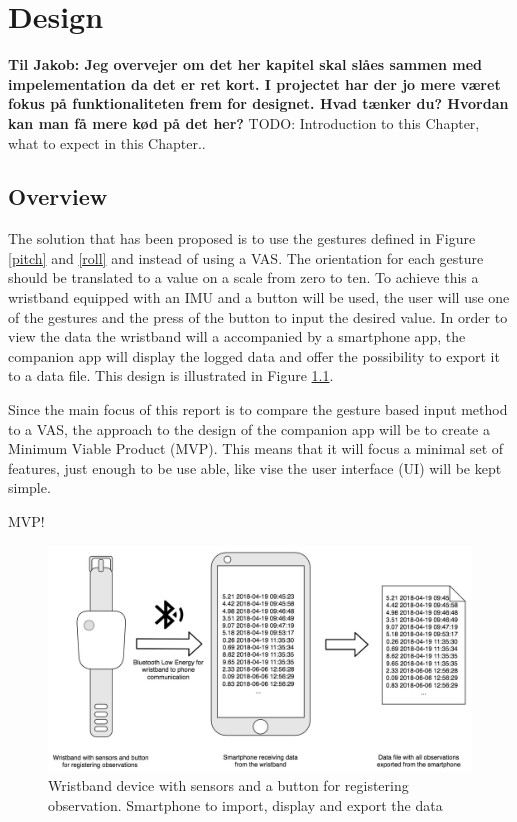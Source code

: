 \chapter{Design}\label{design_ch}
\textbf{Til Jakob: Jeg overvejer om det her kapitel skal slåes sammen med impelementation da det er ret kort. I projectet har der jo mere været fokus på funktionaliteten frem for designet. Hvad tænker du? Hvordan kan man få mere kød på det her?}
TODO: Introduction to this Chapter, what to expect in this Chapter..


\section{Overview}
The solution that has been proposed is to use the gestures defined in Figure \ref{pitch} and \ref{roll} and instead of using a VAS. The orientation for each gesture should be translated to a value on a scale from zero to ten. To achieve this a wristband equipped with an IMU and a button will be used, the user will use one of the gestures and the press of the button to input the desired value. In order to view the data the wristband will a accompanied by a smartphone app, the companion app will display the logged data and offer the possibility to export it to a data file. This design is illustrated in Figure \ref{design_overview}.

Since the main focus of this report is to compare the gesture based input method to a VAS, the approach to the design of the companion app will be to create a Minimum Viable Product (MVP)\cite{mvp}. This means that it will focus a minimal set of features, just enough to be use able, like vise the user interface (UI) will be kept simple.

MVP!

\begin{figure}[h]
    \centering
    \includegraphics[width=1\textwidth]{figures/design_overview.png}
    \caption{Wristband device with sensors and a button for registering observation. Smartphone to import, display and export the data}
    \label{design_overview}
\end{figure}


